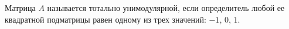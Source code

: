 Матрица $A$ называется тотально унимодулярной, если определитель любой ее квадратной
подматрицы равен одному из трех значений: $-1$, $0$, $1$.